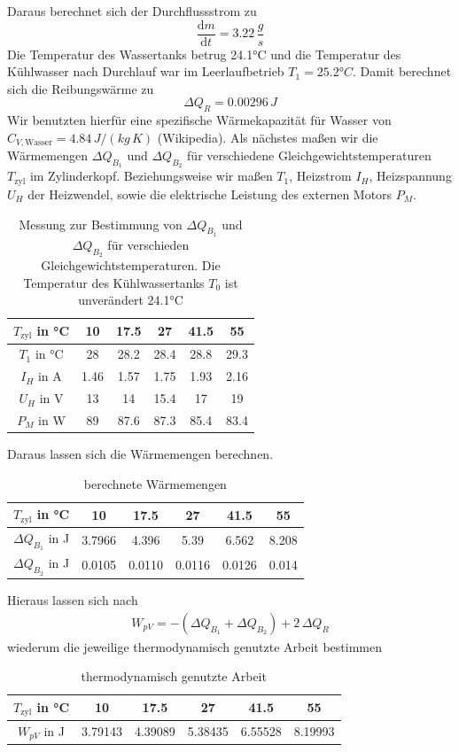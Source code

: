 \documentclass[a4paper, 12pt,]{scrartcl}
\begin{document}
Daraus berechnet sich der Durchflussstrom zu 
$$\frac{\text{d}m}{\text{d}t}=3.22\,\frac{g}{s}$$
Die Temperatur des Wassertanks betrug 24.1°C und die Temperatur des Kühlwasser nach Durchlauf war im Leerlaufbetrieb $T_1=25.2°C$. Damit berechnet sich die Reibungswärme zu 
\begin{equation*}\Delta{Q_R}=0.00296\,J\end{equation*}
Wir benutzten hierfür eine spezifische Wärmekapazität für Wasser von $C_{V,\text{Wasser}}=4.84\,J/(kg\,K)$ (Wikipedia).\newline\newline
Als nächstes maßen wir die Wärmemengen $\Delta{Q_{B_1}}$ und $\Delta{Q_{B_2}}$ für verschiedene Gleichgewichtstemperaturen $T_\text{zyl}$ im Zylinderkopf. Beziehungsweise wir maßen $T_1$, Heizstrom $I_H$, Heizspannung $U_H$ der Heizwendel, sowie die elektrische Leistung des externen Motors $P_M$.
\begin{table}[H]\centering\begin{tabular}{c|ccccc}
$T_\text{zyl}$ in °C&10&17.5&27&41.5&55\\\hline
$T_1$ in °C&28	&28.2	&28.4	&28.8	&29.3\\
$I_H$ in A&1.46	&1.57	&1.75	&1.93	&2.16\\
$U_H$ in V&13	&14	&15.4	&17	&19\\
$P_M$ in W&89	&87.6	&87.3	&85.4	&83.4\end{tabular}
\caption{Messung zur Bestimmung von $\Delta{Q_{B_1}}$ und $\Delta{Q_{B_2}}$ für verschieden Gleichgewichtstemperaturen. Die Temperatur des Kühlwassertanks $T_0$ ist unverändert 24.1°C}\end{table}
Daraus lassen sich die Wärmemengen berechnen.
\begin{table}[H]\centering\begin{tabular}{c|ccccc}
$T_\text{zyl}$ in °C&10&17.5&27&41.5&55\\\hline
$\Delta{Q_{B_1}}$ in J&3.7966&4.396&5.39&6.562&8.208\\
$\Delta{Q_{B_2}}$ in J&0.0105&0.0110&0.0116&0.0126&0.014\end{tabular}
\caption{berechnete Wärmemengen}\end{table}
Hieraus lassen sich nach 
\begin{align*}W_{pV}=-(\Delta{Q_{B_1}}+\Delta{Q_{B_2}})+2\,\Delta{Q_R}\end{align*}
wiederum die jeweilige thermodynamisch genutzte Arbeit bestimmen
\begin{table}[H]\centering\begin{tabular}{c|ccccc}
$T_\text{zyl}$ in °C&10&17.5&27&41.5&55\\\hline
$W_{pV}$ in J&3.79143&4.39089&5.38435&6.55528&8.19993\end{tabular}
\caption{thermodynamisch genutzte Arbeit}\end{table}
\end{document}
